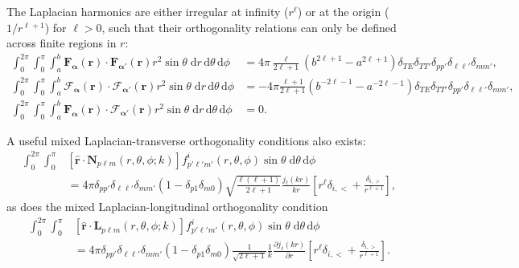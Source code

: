 \documentclass{article}
\begin{document}
 The Laplacian harmonics are either irregular at infinity ($r^\ell$) or at the origin ($1/r^{\ell + 1}$) for $\ell > 0$, such that their orthogonality relations can only be defined across finite regions in $r$:
\begin{equation}\label{eq:laplacianHarmonicOrthogonality}
\begin{split}
\int_0^{2\pi}\int_0^\pi\int_a^b\mathbf{F}_{\bm{\alpha}}(\mathbf{r})\cdot\mathbf{F}_{\bm{\alpha}'}(\mathbf{r})r^2\sin\theta\;\mathrm{d}r\,\mathrm{d}\theta\,\mathrm{d}\phi &= 4\pi\frac{\ell}{2\ell + 1}\left(b^{2\ell + 1} - a^{2\ell + 1}\right)\delta_{T\!E}\delta_{TT'}\delta_{pp'}\delta_{\ell\ell'}\delta_{mm'},\\
\int_0^{2\pi}\int_0^\pi\int_a^b\bm{\mathcal{F}}_{\bm{\alpha}}(\mathbf{r})\cdot\bm{\mathcal{F}}_{\bm{\alpha}'}(\mathbf{r})r^2\sin\theta\;\mathrm{d}r\,\mathrm{d}\theta\,\mathrm{d}\phi &= -4\pi\frac{\ell + 1}{2\ell + 1}\left(b^{-2\ell - 1} - a^{-2\ell - 1}\right)\delta_{TE}\delta_{TT'}\delta_{pp'}\delta_{\ell\ell'}\delta_{mm'},\\
\int_0^{2\pi}\int_0^\pi\int_a^b\mathbf{F}_{\bm{\alpha}}(\mathbf{r})\cdot\bm{\mathcal{F}}_{\bm{\alpha}'}(\mathbf{r})r^2\sin\theta\;\mathrm{d}r\,\mathrm{d}\theta\,\mathrm{d}\phi &= 0.
\end{split}
\end{equation}

A useful mixed Laplacian-transverse orthogonality conditions also exists:
\begin{equation}\label{eq:angularMixedOrthogonalityNf}
\begin{split}
\int_0^{2\pi}\int_0^\pi&\left[\hat{\mathbf{r}}\cdot\mathbf{N}_{p\ell m}(r,\theta,\phi;k)\right]f_{p'\ell'm'}^i(r,\theta,\phi)\sin\theta\;\mathrm{d}\theta\,\mathrm{d}\phi\\
&= 4\pi\delta_{pp'}\delta_{\ell\ell'}\delta_{mm'}(1 - \delta_{p1}\delta_{m0})\sqrt{\frac{\ell(\ell + 1)}{2\ell + 1}}\frac{j_\ell(kr)}{kr}\left[r^\ell\delta_{i,<} + \frac{\delta_{i,>}}{r^{\ell + 1}}\right],
\end{split}
\end{equation}
as does the mixed Laplacian-longitudinal orthogonality condition
\begin{equation}\label{eq:angularMixedOrthogonalityLf}
\begin{split}
\int_0^{2\pi}\int_0^\pi&\left[\hat{\mathbf{r}}\cdot\mathbf{L}_{p\ell m}(r,\theta,\phi;k)\right]f_{p'\ell'm'}^i(r,\theta,\phi)\sin\theta\;\mathrm{d}\theta\,\mathrm{d}\phi\\
&= 4\pi\delta_{pp'}\delta_{\ell\ell'}\delta_{mm'}(1 - \delta_{p1}\delta_{m0})\frac{1}{\sqrt{2\ell + 1}}\frac{1}{k}\frac{\partial j_\ell(kr)}{\partial r}\left[r^\ell\delta_{i,<} + \frac{\delta_{i,>}}{r^{\ell + 1}}\right].
\end{split}
\end{equation}
\end{document}
